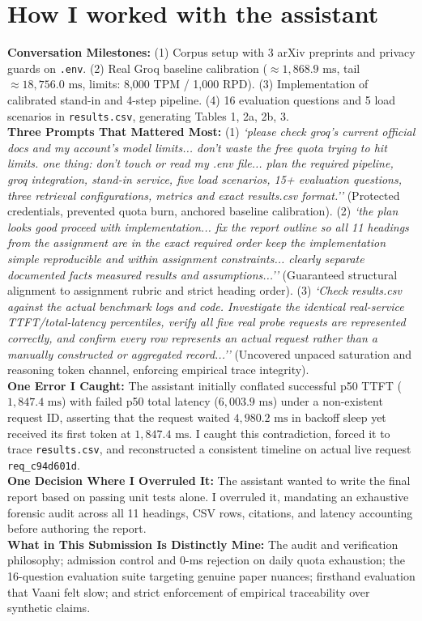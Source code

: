 \documentclass[8.5pt,a4paper]{article}
\begin{document}
\section*{How I worked with the assistant}
\textbf{Conversation Milestones:} (1) Corpus setup with 3 arXiv preprints and privacy guards on \texttt{.env}. (2) Real Groq baseline calibration ($\approx 1,868.9\text{ ms}$, tail $\approx 18,756.0\text{ ms}$, limits: 8,000 TPM / 1,000 RPD). (3) Implementation of calibrated stand-in and 4-step pipeline. (4) 16 evaluation questions and 5 load scenarios in \texttt{results.csv}, generating Tables 1, 2a, 2b, 3.\\
\textbf{Three Prompts That Mattered Most:}  
(1) \textit{`please check groq's current official docs and my account's model limits... don't waste the free quota trying to hit limits. one thing: don't touch or read my .env file... plan the required pipeline, groq integration, stand-in service, five load scenarios, 15+ evaluation questions, three retrieval configurations, metrics and exact results.csv format.''} (Protected credentials, prevented quota burn, anchored baseline calibration).  
(2) \textit{`the plan looks good proceed with implementation... fix the report outline so all 11 headings from the assignment are in the exact required order keep the implementation simple reproducible and within assignment constraints... clearly separate documented facts measured results and assumptions...''} (Guaranteed structural alignment to assignment rubric and strict heading order).  
(3) \textit{`Check results.csv against the actual benchmark logs and code. Investigate the identical real-service TTFT/total-latency percentiles, verify all five real probe requests are represented correctly, and confirm every row represents an actual request rather than a manually constructed or aggregated record...''} (Uncovered unpaced saturation and reasoning token channel, enforcing empirical trace integrity).\\
\textbf{One Error I Caught:} The assistant initially conflated successful p50 TTFT ($1,847.4\text{ ms}$) with failed p50 total latency ($6,003.9\text{ ms}$) under a non-existent request ID, asserting that the request waited $4,980.2\text{ ms}$ in backoff sleep yet received its first token at $1,847.4\text{ ms}$. I caught this contradiction, forced it to trace \texttt{results.csv}, and reconstructed a consistent timeline on actual live request \texttt{req\_c94d601d}.\\
\textbf{One Decision Where I Overruled It:} The assistant wanted to write the final report based on passing unit tests alone. I overruled it, mandating an exhaustive forensic audit across all 11 headings, CSV rows, citations, and latency accounting before authoring the report.\\
\textbf{What in This Submission Is Distinctly Mine:} The audit and verification philosophy; admission control and 0-ms rejection on daily quota exhaustion; the 16-question evaluation suite targeting genuine paper nuances; firsthand evaluation that Vaani felt slow; and strict enforcement of empirical traceability over synthetic claims.
\end{document}
